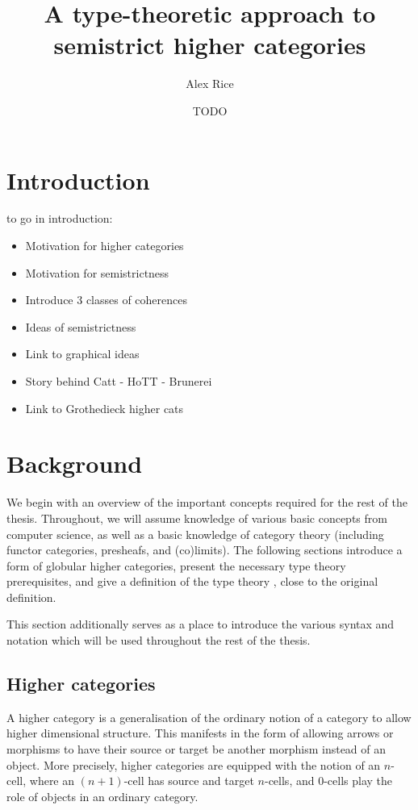 \documentclass{cam-thesis}
\title{A type-theoretic approach to semistrict higher categories}
\author{Alex Rice}
\date{TODO}
\begin{document}
\frontmatter{}



\chapter{Introduction}
\Things to go in introduction:
\begin{itemize}
\item Motivation for higher categories
\item Motivation for semistrictness
\item Introduce 3 classes of coherences
\item Ideas of semistrictness
\item Link to graphical ideas
\item Story behind Catt - HoTT - Brunerei
\item Link to Grothedieck higher cats
\end{itemize}

\chapter{Background}
\label{sec:background}

We begin with an overview of the important concepts required for the rest of the thesis. Throughout, we will assume knowledge of various basic concepts from computer science, as well as a basic knowledge of category theory (including functor categories, presheafs, and (co)limits). The following sections introduce a form of globular higher categories, present the necessary type theory prerequisites, and give a definition of the type theory \Catt, close to the original definition.

This section additionally serves as a place to introduce the various syntax and notation which will be used throughout the rest of the thesis.

\section{Higher categories}
\label{sec:higher-categories}

A higher category is a generalisation of the ordinary notion of a category to allow higher dimensional structure. This manifests in the form of allowing arrows or morphisms to have their source or target be another morphism instead of an object. More precisely, higher categories are equipped with the notion of an \(n\)-cell, where an \((n+1)\)-cell has source and target \(n\)-cells, and \(0\)-cells play the role of objects in an ordinary category.
\end{document}
